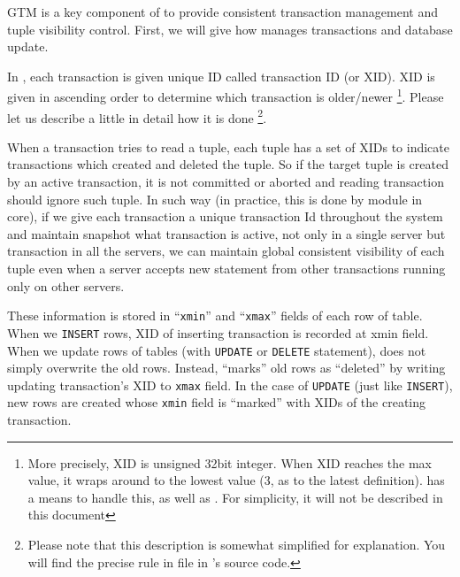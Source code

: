 

  GTM is a key component of \XC{} to provide consistent transaction management
  and tuple visibility control.
  First, we will give how \PG{} manages transactions and database update.



  In \PG, each transaction is given unique ID called transaction ID (or XID).
  XID is given in ascending order to determine which transaction is older/newer%
  \footnote{
	  More precisely, XID is unsigned 32bit integer.
	  When XID reaches the max value,
	  it wraps around to the lowest value (3, as to the latest definition).
	  \PG{} has a means to handle this, as well as \XC.
	  For simplicity, it will not be described in this document
  }.
  Please let us describe a little in detail how it is done%
  \footnote{
	  Please note that this description is somewhat simplified for explanation.
	  You will find the precise rule in  file in \PG's source code.
  }.
  
  When a transaction tries to read a tuple, each tuple has a set of XIDs
  to indicate transactions which created and deleted the tuple.
  So if the target tuple is created by an active transaction,
  it is not committed or aborted and reading transaction should ignore such tuple.
  In such way (in practice, this is done by  module in \PG{} core),
  if we give each transaction a unique transaction Id throughout the system
  and maintain snapshot what transaction is active,
  not only in a single server but transaction in all the servers,
  we can maintain global consistent visibility of each tuple
  even when a server accepts new statement from other transactions running only on other servers.
  
  These information is stored in ``\texttt{xmin}'' and ``\texttt{xmax}'' fields of each row of table.
  When we \texttt{INSERT} rows, XID of inserting transaction is recorded at xmin field.
  When we update rows of tables (with \texttt{UPDATE} or \texttt{DELETE} statement),
  \PG{} does not simply overwrite the old rows.
  Instead, \PG{} ``marks'' old rows as ``deleted'' by writing updating transaction's XID
  to \texttt{xmax} field.
  In the case of \texttt{UPDATE} (just like \texttt{INSERT}),
  new rows are created whose \texttt{xmin} field is ``marked'' with XIDs of the creating transaction.
  
